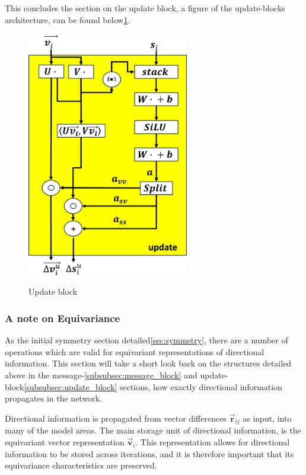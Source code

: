 This concludes the section on the update block, a figure of the update-blocks architecture, can be found below\ref{img:update_block}.

\begin{figure}[H]
    \caption{Update block}
    \centering\label{img:update_block}
    \includegraphics[width=200pt]{Images/Method/update_block.png}
\end{figure}

\subsubsection{A note on Equivariance}\label{note-equivariance}

As the initial symmetry section detailed\ref{sec:symmetry}, there are a number of operations which are valid for equivariant representations
of directional information. This section will take a short look back on the structures detailed above in the
message-\ref{subsubsec:message_block} and update-block\ref{subsubsec:update_block} sections, how exactly directional information
propagates in the network.

Directional information is propagated from vector differences $\vec{\mathbf{r}}_{ij}$ as input, into many of the model areas. The main storage
unit of directional information, is the equivariant vector representation $\vec{\mathbf{v}}_{i}$. This representation allows for directional
information to be stored across iterations, and it is therefore important that its equivariance characteristics are preserved.

